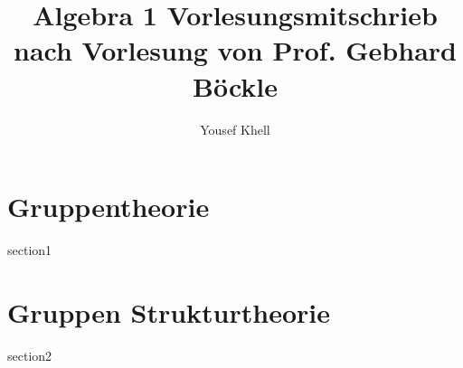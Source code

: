\documentclass[a4paper]{book}
\title{\vspace{-2cm} Algebra 1 Vorlesungsmitschrieb\\nach Vorlesung von Prof. Gebhard Böckle}
\author{Yousef Khell}
\begin{document}
\maketitle
\tableofcontents

\chapter{Gruppentheorie}
{section1}

\chapter{Gruppen Strukturtheorie}
{section2}
\end{document}
